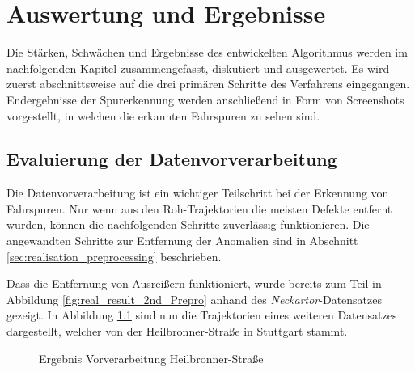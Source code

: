 
\chapter{Auswertung und Ergebnisse}
\label{cha:results}

Die Stärken, Schwächen und Ergebnisse des entwickelten Algorithmus werden im nachfolgenden Kapitel
zusammengefasst, diskutiert und ausgewertet. Es wird zuerst abschnittsweise auf die drei primären Schritte
des Verfahrens eingegangen. Endergebnisse der Spurerkennung werden anschließend
in Form von Screenshots vorgestellt, in welchen die erkannten Fahrspuren zu sehen sind.

\section{Evaluierung der Datenvorverarbeitung}
\label{sec:results_eval_dataprocessing}

Die Datenvorverarbeitung ist ein wichtiger Teilschritt bei der Erkennung von Fahrspuren. Nur wenn aus
den Roh-Trajektorien die meisten Defekte entfernt wurden, können die nachfolgenden
Schritte zuverlässig funktionieren. Die angewandten Schritte zur
Entfernung der Anomalien sind in Abschnitt \ref{sec:realisation_preprocessing} beschrieben.

Dass die Entfernung von Ausreißern funktioniert, wurde bereits zum Teil in Abbildung
\ref{fig:real_result_2nd_Prepro} anhand des \textit{Neckartor}-Datensatzes gezeigt.
In Abbildung \ref{fig:results_prePro_heilbronner} sind nun die Trajektorien eines weiteren Datensatzes dargestellt,
welcher von der Heilbronner-Straße in Stuttgart stammt.

\begin{figure}[H]
    \centering
    \qquad \qquad
    \caption{Ergebnis Vorverarbeitung Heilbronner-Straße}
    \label{fig:results_prePro_heilbronner}
\end{figure}

